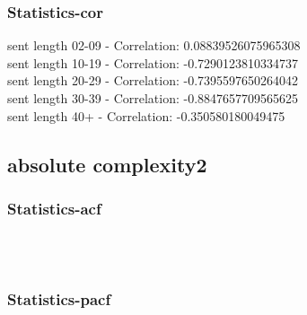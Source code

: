 \documentclass{article}%
\begin{document}
%
\newpage%
\subsubsection{Statistics{-}cor}%
\label{ssubsec:Statistics{-}cor}%
\noindent%
sent length 02-09 - Correlation: 0.08839526075965308\\%
sent length 10-19 - Correlation: -0.7290123810334737\\%
sent length 20-29 - Correlation: -0.7395597650264042\\%
sent length 30-39 - Correlation: -0.8847657709565625\\%
sent length 40+ - Correlation: -0.350580180049475\\

%
\newpage

%
\subsection{absolute complexity2}%
\label{subsec:absolutecomplexity2}%
\subsubsection{Statistics{-}acf}%
\label{ssubsec:Statistics{-}acf}%


\begin{figure}[ht]%
\centering%
\setlength{\abovecaptionskip}{-35pt}%
%
%
\\%
%
%
\\%
%
\end{figure}

%
\newpage%
\subsubsection{Statistics{-}pacf}%
\label{ssubsec:Statistics{-}pacf}%
\end{document}
